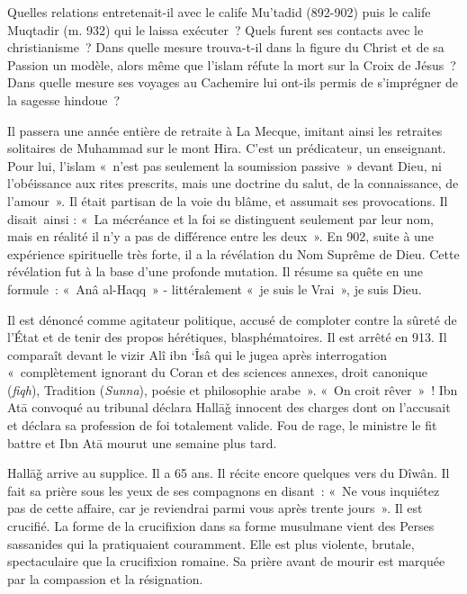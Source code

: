 Quelles relations entretenait-il avec le calife Mu'tadid (892-902) puis
le calife Muqtadir (m. 932) qui le laissa exécuter~? Quels furent ses
contacts avec le christianisme~? Dans quelle mesure trouva-t-il dans la
figure du Christ et de sa Passion un modèle, alors même que l'islam
réfute la mort sur la Croix de Jésus~? Dans quelle mesure ses voyages au
Cachemire lui ont-ils permis de s'imprégner de la sagesse hindoue~?

Il passera une année entière de retraite à La Mecque, imitant ainsi les
retraites solitaires de Muhammad sur le mont Hira. C'est un prédicateur,
un enseignant. Pour lui, l'islam «~n'est pas seulement la soumission
passive~» devant Dieu, ni l'obéissance aux rites prescrits, mais une
doctrine du salut, de la connaissance, de l'amour~». Il était partisan
de la voie du blâme, et assumait ses provocations. Il disait~ainsi :
«~La mécréance et la foi se distinguent seulement par leur nom, mais en
réalité il n'y a pas de différence entre les deux~». En 902, suite à une
expérience spirituelle très forte, il a la révélation du Nom Suprême de
Dieu. Cette révélation fut à la base d'une profonde mutation. Il résume
sa quête en une formule~: «~Anâ al-Haqq~» - littéralement «~je suis le
Vrai~», je suis Dieu.


Il est dénoncé comme agitateur politique, accusé de comploter contre la
sûreté de l'État et de tenir des propos hérétiques, blasphématoires. Il
est arrêté en 913. Il comparaît devant le vizir Alî ibn `Îsâ qui le
jugea après interrogation «~complètement ignorant du Coran et des
sciences annexes, droit canonique (\emph{fiqh}), Tradition
(\emph{Sunna}), poésie et philosophie arabe~». «~On croit rêver~»~! Ibn Atā convoqué au
tribunal déclara Hallāǧ innocent des charges dont on l'accusait et
déclara sa profession de foi totalement valide. Fou de rage, le ministre
le fit battre et Ibn Atā mourut une semaine plus tard.

Hallāǧ arrive au supplice. Il a 65 ans. Il récite encore quelques vers
du Dîwân. Il fait sa prière sous les yeux de ses compagnons en disant~:
«~Ne vous inquiétez pas de cette affaire, car je reviendrai parmi vous
après trente jours~». Il est crucifié. La forme de la crucifixion dans
sa forme musulmane vient des Perses sassanides qui la pratiquaient
couramment. Elle est plus violente, brutale, spectaculaire que la
crucifixion romaine. Sa prière avant de mourir est marquée par la
compassion et la résignation.

